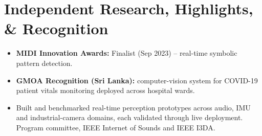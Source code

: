 \documentclass[11pt]{article}
\begin{document}
\vspace{-1em}
\section*{Independent Research, Highlights, \& Recognition}
\begin{itemize}[leftmargin=1.2em, itemsep=-0.25em]
    \item \textbf{MIDI Innovation Awards:} Finalist (Sep 2023) -- real-time symbolic pattern detection.
    \item \textbf{GMOA Recognition (Sri Lanka):} computer-vision system for COVID-19 patient vitals monitoring deployed across hospital wards.
    \item Built and benchmarked real-time perception prototypes across audio, IMU and industrial-camera domains, each validated through live deployment. Program committee, IEEE Internet of Sounds and IEEE I3DA.
\end{itemize}
\end{document}
